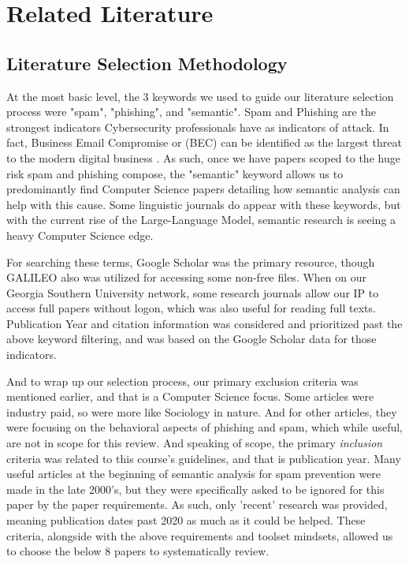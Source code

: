 \documentclass[conference]{IEEEtran}
\begin{document}
\section{Related Literature}

\subsection{Literature Selection Methodology}
At the most basic level, the 3 keywords we used to guide our literature selection process were "spam", "phishing", and "semantic".
Spam and Phishing are the strongest indicators Cybersecurity professionals have as indicators of attack.
In fact, Business Email Compromise or (BEC) can be identified as the largest threat to the modern digital business \cite{saidani1}.
As such, once we have papers scoped to the huge risk spam and phishing compose, the "semantic" keyword allows us to predominantly find Computer Science papers detailing how semantic analysis can help with this cause.
Some linguistic journals do appear with these keywords, but with the current rise of the Large-Language Model, semantic research is seeing a heavy Computer Science edge.

For searching these terms, Google Scholar was the primary resource, though GALILEO also was utilized for accessing some non-free files. When on our Georgia Southern University network, some research journals allow our IP to access full papers without logon, which was also useful for reading full texts. Publication Year and citation information was considered and prioritized past the above keyword filtering, and was based on the Google Scholar data for those indicators.

And to wrap up our selection process, our primary exclusion criteria was mentioned earlier, and that is a Computer Science focus.
Some articles were industry paid, so were more like Sociology in nature.
And for other articles, they were focusing on the behavioral aspects of phishing and spam, which while useful, are not in scope for this review.
And speaking of scope, the primary \textit{inclusion} criteria was related to this course's guidelines, and that is publication year.
Many useful articles at the beginning of semantic analysis for spam prevention were made in the late 2000's, but they were specifically asked to be ignored for this paper by the paper requirements.
As such, only 'recent' research was provided, meaning publication dates past 2020 as much as it could be helped. 
These criteria, alongside with the above requirements and toolset mindsets, allowed us to choose the below 8 papers to systematically review. %
\end{document}
